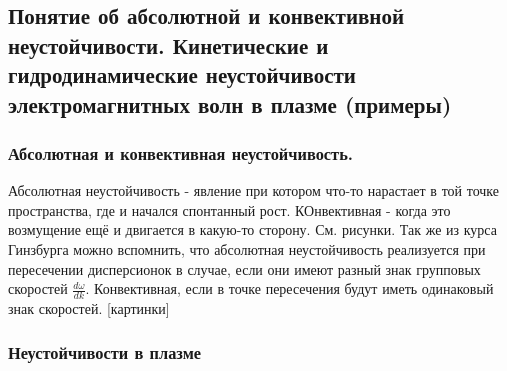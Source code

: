 \documentclass[10pt, a4paper]{article}
\begin{document}
\subsection{Понятие об абсолютной и конвективной неустойчивости. Кинетические и гидродинамические неустойчивости электромагнитных волн в плазме (примеры)}

\subsubsection{Абсолютная и конвективная неустойчивость.}
Абсолютная неустойчивость - явление при котором что-то нарастает в той точке пространства, где и начался спонтанный рост. КОнвективная - когда это возмущение ещё и двигается в какую-то сторону. См. рисунки. Так же из курса Гинзбурга можно вспомнить, что абсолютная неустойчивость реализуется при пересечении дисперсионок в случае, если они имеют разный знак групповых скоростей $\frac {d\omega}{dk}$. Конвективная, если в точке пересечения будут иметь одинаковый знак скоростей.
[картинки]
\subsubsection{Неустойчивости в плазме} \label{subsec:plasma_B_instabilities}
\end{document}
